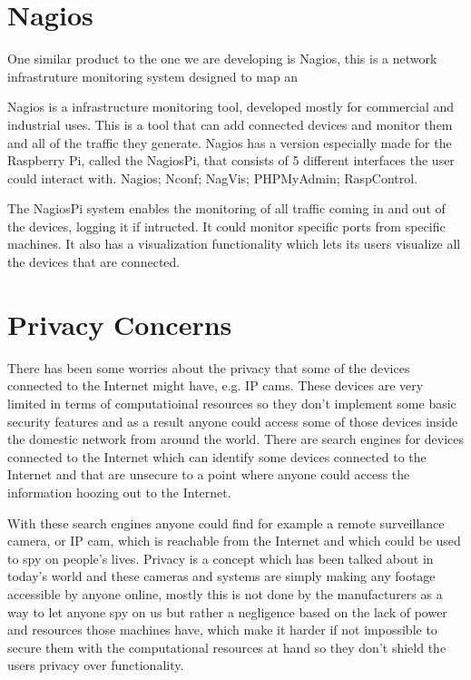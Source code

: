 \section{Nagios}
\label{chap2:sec:nag}

One similar product to the one we are developing is Nagios, this is a network
infrastruture monitoring system designed to map an

Nagios is a infrastructure monitoring tool, developed mostly for commercial and
industrial uses. This is a tool that can add connected devices and monitor them
and all of the traffic they generate. Nagios has a version especially made for
the Raspberry Pi, called the NagiosPi, that consists of 5 different interfaces
the user could interact with.
Nagios;
Nconf;
NagVis;
PHPMyAdmin;
RaspControl.

The NagiosPi system enables the monitoring of all traffic coming in and out of
the devices, logging it if intructed. It could monitor specific ports from
specific machines. It also has a visualization functionality which lets its
users visualize all the devices that are connected.

\section{Privacy Concerns}
\label{chap2:sec:priv}
There has been some worries about the privacy that some of the devices
connected to the Internet might have, e.g. IP cams. These devices are very
limited in terms of computatioinal resources so they don't implement some basic
security features and as a result anyone could access some of those devices
inside the domestic network from around the world.
There are search engines for devices connected to the Internet which can
identify some devices connected to the Internet and that are unsecure to a
point where anyone could access the information hoozing out to the Internet.

With these search engines anyone could find for example a remote surveillance
camera, or IP cam, which is reachable from the Internet and which could be used
to spy on people's lives. Privacy is a concept which has been talked about in
today's world and these cameras and systems are simply making any footage
accessible by anyone online, mostly this is not done by the manufacturers as a
way to let anyone spy on us but rather a negligence based on the lack of power
and resources those machines have, which make it harder if not impossible to
secure them with the computational resources at hand so they don't shield the
users privacy over functionality.


